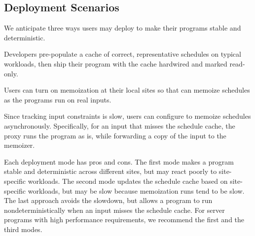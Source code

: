 \subsection{Deployment Scenarios} \label{sec:offline}

We anticipate three ways users may deploy \tern to make their programs
stable and deterministic.

 Developers pre-populate a cache of correct,
representative schedules on typical workloads, then ship their program
with the cache hardwired and marked read-only.

  Users can turn on memoization at their local
sites so that \tern can memoize schedules as the programs run on real
inputs.

 Since tracking input constraints is slow, users
can configure \tern to memoize schedules asynchronously.  Specifically, for
an input that misses the schedule cache, the proxy runs the program as is,
while forwarding a copy of the input to the memoizer.

\para{} Each deployment mode has pros and cons.  The first mode makes a
program stable and deterministic across different sites, but may react
poorly to site-specific workloads.  The second mode updates the schedule
cache based on site-specific workloads, but may be slow because
memoization runs tend to be slow.  The last approach avoids the slowdown,
but allows a program to run nondeterministically when an input misses the
schedule cache.  For server programs with high performance requirements,
we recommend the first and the third modes.





